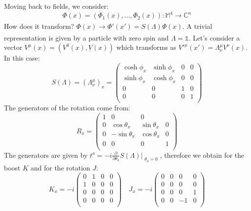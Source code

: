 \documentclass[../main.tex]{subfiles}
\begin{document}
Moving back to fields, we consider:
\[
\Phi(x)=(\Phi_1(x),\dots,\Phi_2(x)):\mathbb{M}^4\xrightarrow[]{}\mathbb{C}^n
\]
How does it transform? $\Phi(x)\xrightarrow[]{}\Phi'(x')=S(\Lambda)\Phi(x)$. A trivial representation is given by a particle with zero spin and $\Lambda=\mathbb{1}$. Let's consider a vector $V^{\mu}(x)=(V^0(x),\underline{V}(x))$ which transforms as $V'^{\mu}(x')=\Lambda^{\mu}_{\nu}V^{\nu}(x)$. In this case:
\[
S(\Lambda)=(\Lambda^{\mu}_{\nu})_x=\left(\begin{array}{cccc}
    \cosh\phi_x & \sinh\phi_x & 0 & 0 \\
    \sinh\phi_x & \cosh\phi_x & 0 & 0 \\
    0 & 0 & 1 & 0 \\
    0 & 0 & 0 & 1 \\
    \end{array}\right)
\]
The generators of the rotation come from:
\[
R_x=\left(\begin{array}{cccc}
    1 & 0 & 0 \\
    0 & \cos\theta_x & \sin\theta_x & 0 \\
    0 & -\sin\theta_x & \cos\theta_x & 0 \\
    0 & 0 & 0 & 1 \\
    \end{array}\right)
\]
The generators are given by $t^a=-i\frac{\partial}{\partial\theta_a}S(\Lambda)\Bigr|_{\substack{\theta_a=0}}$, therefore we obtain for the boost $K$ and for the rotation $J$:
\[
K_x=-i\left(\begin{array}{cccc}
     0 & 1 & 0 & 0 \\
     1 & 0 & 0 & 0 \\
     0 & 0 & 0 & 0 \\
     0 & 0 & 0 & 0 \\
\end{array}\right)
\quad 
J_x=-i\left(\begin{array}{cccc}
     0 & 0 & 0 & 0 \\
     0 & 0 & 0 & 0 \\
     0 & 0 & 0 & 1 \\
     0 & 0 & -1 & 0 \\
\end{array}\right)
\]
\end{document}
